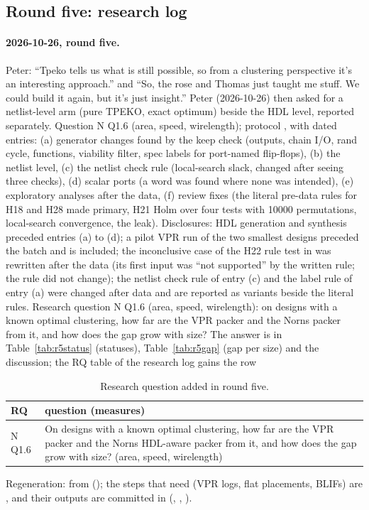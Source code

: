
\subsection{Round five: research log}
\label{sec:r5-appendix}
\paragraph{2026-10-26, round five.} Peter: ``Tpeko tells us what is still possible, so from a clustering perspective it's an interesting approach.'' and ``So, the rose and Thomas just taught me stuff. We could build it again, but it's just insight.'' Peter (2026-10-26) then asked for a netlist-level arm (pure TPEKO, exact optimum) beside the HDL level, reported separately. Question N Q1.6 (area, speed, wirelength); protocol , with dated entries: (a) generator changes found by the keep check (outputs, chain I/O, rand cycle,  functions, viability filter, spec labels for port-named flip-flops), (b) the netlist level, (c) the netlist check rule (local-search slack, changed after seeing three checks), (d)  scalar ports (a word was found where none was intended), (e) exploratory analyses after the data, (f) review fixes (the literal pre-data rules for H18 and H28 made primary, H21 Holm over four tests with 10000 permutations, local-search convergence, the leak). Disclosures: HDL generation and synthesis preceded entries (a) to (d); a pilot VPR run of the two smallest designs preceded the batch and is included; the inconclusive case of the H22 rule test in  was rewritten after the data (its first input was ``not supported'' by the written rule; the rule did not change); the netlist check rule of entry (c) and the label rule of entry (a) were changed after data and are reported as variants beside the literal rules.
Research question N Q1.6 (area, speed, wirelength): on designs with a known optimal clustering, how far are the VPR packer and the Norns packer from it, and how does the gap grow with size? The answer is in Table~\ref{tab:r5status} (statuses), Table~\ref{tab:r5gap} (gap per size) and the discussion; the RQ table of the research log gains the row

\begin{table}[t]
\caption{Research question added in round five.}
\label{tab:r5rq}
\centering\scriptsize
\begin{tabular}{@{}lp{6.4cm}@{}}
\toprule
RQ & question (measures) \\
\midrule
N Q1.6 & On designs with a known optimal clustering, how far are the VPR packer and the Norns HDL-aware packer from it, and how does the gap grow with size? (area, speed, wirelength) \\
\bottomrule
\end{tabular}
\end{table}
Regeneration:  from  (); the steps that need  (VPR logs, flat placements, BLIFs) are , and their outputs are committed in  (, , ).

